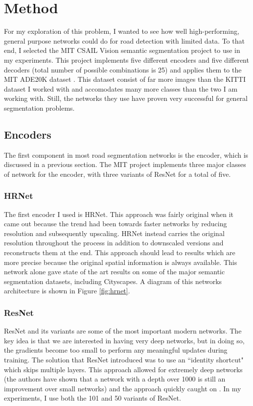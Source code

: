\documentclass[10pt,twocolumn,letterpaper]{article}
\begin{document}
\section{Method}
For my exploration of this problem, I wanted to see how well high-performing, general purpose networks could do for road detection with limited data. To that end, I selected the MIT CSAIL Vision semantic segmentation project to use in my experiments. This project implements five different encoders and five different decoders (total number of possible combinations is 25) and applies them to the MIT ADE20K dataset \cite{zhou18}. This dataset consist of far more images than the KITTI dataset I worked with and accomodates many more classes than the two I am working with. Still, the networks they use have proven very successful for general segmentation problems.

\subsection{Encoders}
The first component in most road segmentation networks is the encoder, which is discussed in a previous section. The MIT project implements three major classes of network for the encoder, with three variants of ResNet for a total of five. 
\subsubsection{HRNet}
The first encoder I used is HRNet. This approach was fairly original when it came out because the trend had been towards faster networks by reducing resolution and subsequently upscaling. HRNet instead carries the original resolution throughout the process in addition to downscaled versions and reconstructs them at the end. This approach should lead to results which are more precise because the original spatial information is always available. This network alone gave state of the art results on some of the major semantic segmentation datasets, including Cityscapes. A diagram of this networks architecture is shown in Figure \ref{fig:hrnet}.

\subsubsection{ResNet}
ResNet and its variants are some of the most important modern networks. The key idea is that we are interested in having very deep networks, but in doing so, the gradients become too small to perform any meaningful updates during training. The solution that ResNet introduced was to use an ``identity shortcut" which skips multiple layers. This approach allowed for extremely deep networks (the authors have shown that a network with a depth over 1000 is still an improvement over small networks) and the approach quickly caught on \cite{He16}. In my experiments, I use both the 101 and 50 variants of ResNet.
\end{document}
